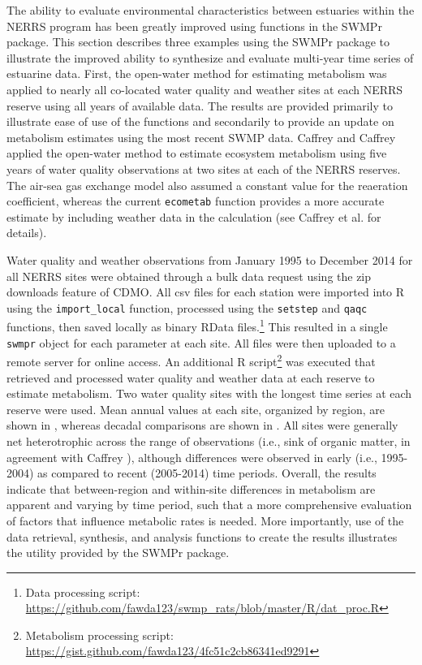 \documentclass[10pt,letterpaper]{article}\usepackage[]{graphicx}\usepackage[]{color}
\begin{document}
The ability to evaluate environmental characteristics between estuaries within the \ac{NERRS} program has been greatly improved using functions in the SWMPr package.  This section describes three examples using the SWMPr package to illustrate the improved ability to synthesize and evaluate multi-year time series of estuarine data. First, the open-water method for estimating metabolism was applied to nearly all co-located water quality and weather sites at each \ac{NERRS} reserve using all years of available data.  The results are provided primarily to illustrate ease of use of the functions and secondarily to provide an update on metabolism estimates using the most recent \ac{SWMP} data.  Caffrey \cite{Caffrey03} and Caffrey \cite{Caffrey04} applied the open-water method to estimate ecosystem metabolism using five years of water quality observations at two sites at each of the \ac{NERRS} reserves.  The air-sea gas exchange model also assumed a constant value for the reaeration coefficient, whereas the current \texttt{ecometab} function provides a more accurate estimate by including weather data in the calculation (see Caffrey et al. \cite{Caffrey14} for details).

Water quality and weather observations from January 1995 to December 2014 for all \ac{NERRS} sites were obtained through a bulk data request using the zip downloads feature of \ac{CDMO}.  All csv files for each station were imported into R using the \texttt{import\_local} function, processed using the \texttt{setstep} and \texttt{qaqc} functions, then saved locally as binary RData files.\footnote{Data processing script: \url{https://github.com/fawda123/swmp_rats/blob/master/R/dat_proc.R}} This resulted in a single \texttt{swmpr} object for each parameter at each site.  All files were then uploaded to a remote server for online access.  An additional R script\footnote{Metabolism processing script: \url{https://gist.github.com/fawda123/4fc51c2cb86341ed9291}} was executed that retrieved and processed water quality and weather data at each reserve to estimate metabolism.  Two water quality sites with the longest time series at each reserve were used.  Mean annual values at each site, organized by region, are shown in , whereas decadal comparisons are shown in .  All sites were generally net heterotrophic across the range of observations (i.e., sink of organic matter, in agreement with Caffrey \cite{Caffrey03}), although differences were observed in early (i.e., 1995-2004) as compared to recent (2005-2014) time periods. Overall, the results indicate that between-region and within-site differences in metabolism are apparent and varying by time period, such that a more comprehensive evaluation of factors that influence metabolic rates is needed.  More importantly, use of the data retrieval, synthesis, and analysis functions to create the results illustrates the utility provided by the SWMPr package.
\end{document}
